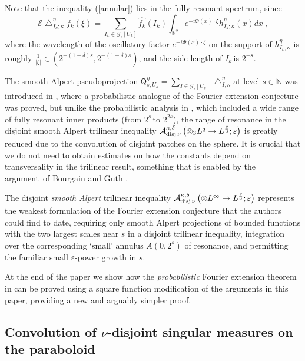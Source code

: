 \documentclass{amsart}%
\theoremstyle{plain}
\numberwithin{equation}{section}
\begin{document}
Note that the inequality (\ref{annular}) lies in the fully resonant spectrum,
since
\[
\mathcal{E}\bigtriangleup_{I_{k};\kappa}^{\eta}f_{k}\left(  \xi\right)
=\sum_{I_{k}\in\mathcal{G}_{s}\left[  U_{k}\right]  }\widehat{f_{k}}\left(
I_{k}\right)  \int_{\mathbb{R}^{2}}e^{-i\Phi\left(  x\right)  \cdot\xi
}h_{I_{k};\kappa}^{\eta}\left(  x\right)  dx\ ,
\]
where the wavelength of the oscillatory factor $e^{-i\Phi\left(  x\right)
\cdot\xi}$ on the support of $h_{I_{k};\kappa}^{\eta}$ is roughly $\frac
{1}{\left\vert \xi\right\vert }\in\left(  2^{-\left(  1+\delta\right)
s},2^{-\left(  1-\delta\right)  s}\right)  $, and the side length of $I_{k}%
\,$is $2^{-s}$.

The smooth Alpert pseudoprojection $\mathsf{Q}_{s,U_{k}}^{\eta}=\sum
_{I\in\mathcal{G}_{s}\left[  U_{k}\right]  }\bigtriangleup_{I;\kappa}^{\eta}%
$at level $s\in\mathbb{N}$ was introduced in \cite{Saw7}, where a
probabilistic analogue of the Fourier extension conjecture was proved, but
unlike the probabilistic analysis in \cite{Saw7}, which included a wide range
of fully resonant inner products (from $2^{s}\,$to $2^{2s}$), the range of
resonance in the disjoint smooth Alpert trilinear inequality $\mathcal{A}%
_{\mathop{\rm
disj}\nu}^{\kappa,\delta}\left(  \otimes_{3}L^{q}\rightarrow L^{\frac{q}{3}%
};\varepsilon\right)  $ is greatly reduced due to the convolution of disjoint
patches on the sphere. It is crucial that we do not need to obtain estimates
on how the constants depend on transversality in the trilinear result,
something that is enabled by the argument\ of Bourgain and Guth \cite{BoGu}.

The disjoint \emph{smooth Alpert }trilinear inequality $\mathcal{A}%
_{\mathop{\rm disj}\nu}^{\kappa,\delta}\left(  \otimes L^{\infty}\rightarrow
L^{\frac{q}{3}};\varepsilon\right)  $ represents the weakest formulation of
the Fourier extension conjecture that the authors could find to date,
requiring only smooth Alpert projections of bounded functions with the two
largest scales near $s$ in a disjoint trilinear inequality, integration over
the corresponding `small' annulus $A\left(  0,2^{s}\right)  $ of resonance,
and permitting the familiar small $\varepsilon$-power growth in $s$.

At the end of the paper we show how the \emph{probabilistic} Fourier extension
theorem in \cite{Saw7} can be proved using a square function modification of
the arguments in this paper, providing a new and arguably simpler proof.

\subsection{Convolution of $\nu$-disjoint singular measures on the paraboloid}
\end{document}
